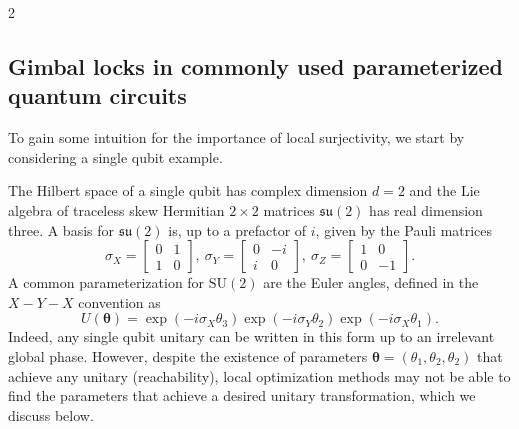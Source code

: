 \documentclass{article}
\renewcommand{\vec}[1]{\ensuremath{\boldsymbol{#1}}}
\begin{document}
\begin{multicols}{2}
\subsection{Gimbal locks in commonly used parameterized quantum circuits}

To gain some intuition for the importance of local surjectivity, we start by considering a single qubit example. 

The Hilbert space of a single qubit has complex dimension \(d=2\) and the Lie algebra of traceless skew Hermitian \(2 \times 2\) matrices \(\mathfrak{su}(2)\) has real dimension three.
A basis for \(\mathfrak{su}(2)\) is, up to a prefactor of \(i\), given by the Pauli matrices
\begin{equation}
    \sigma_X = \begin{bmatrix}
        0 & 1 \\ 1 & 0
    \end{bmatrix}, \  \sigma_Y = \begin{bmatrix}
        0 & -i \\ i & 0
    \end{bmatrix}, \  \sigma_Z = \begin{bmatrix}
        1 & 0 \\ 0 & -1
    \end{bmatrix}.
\end{equation}
A common parameterization for \(\mathrm{SU}(2)\) are the Euler angles, defined in the \(X-Y-X\) convention as
\begin{equation}
    \label{eq:euler_angles}
    U(\vec{\theta}) = \exp(-i\sigma_X\theta_3) \exp(-i\sigma_Y\theta_2) \exp(-i\sigma_X\theta_1).
\end{equation}
Indeed, any single qubit unitary can be written in this form up to an irrelevant global phase. However, despite the existence of parameters $\vec{\theta}=(\theta_{1},\theta_{2},\theta_{2})$ that achieve any unitary (reachability), local optimization methods may not be able to find the parameters that achieve a desired unitary transformation, which we discuss below. 


\end{multicols}
\end{document}
